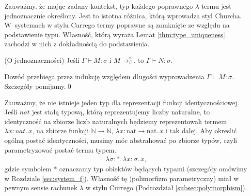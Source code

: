 Zauważmy, że mając zadany kontekst, typ każdego poprawnego \(\lambda\)-termu jest jednoznacznie określony. Jest to istotna różnica, którą wprowadza styl Churcha. W~systemach w stylu Currego termy poprawne są zamknięte ze względu na podstawienie typu. Własność, którą wyraża Lemat \ref{thm:type_uniqueness} zachodzi w nich z dokładnością do podstawienia. 

\begin{lemat}\label{thm:type_uniqueness}(O jednoznaczności)
  Jeśli \(\Gamma\vdash M:\sigma\) i \(M\to^{*}_\beta\), to \(\Gamma\vdash N:\sigma\).
\end{lemat}
\begin{dowod}
  Dowód przebiega przez indukcję względem długości wyprowadzenia \(\Gamma\vdash M:\sigma\). Szczegóły pomijamy.\qed
\end{dowod}

\begin{przyklad}\label{ex:church_identity}
Zauważmy, że nie istnieje jeden typ dla reprezentacji funkcji identycznościowej. Jeśli \(nat\) jest stałą typową, którą reprezentujemy liczby naturalne, to identyczność na zbiorze liczb naturalnych będziemy reprezentowali termem \(\lambda x:nat.\,x\), na zbiorze funkcji \(\mathbb{N}\to\mathbb{N}\), \(\lambda x:\mathrm{nat}\to\mathrm{nat}.\,x\) i tak dalej.
  Aby okreslić ogólną postać identyczności, musimy móc abstrahować po zbiorze typów, czyli parametryzować postać termu typem. %
      \begin{align*}
        \lambda \sigma:* .\,\lambda x:\sigma.\,x,
      \end{align*}
      gdzie symbolem \(*\) oznaczamy typ obiektów będących typami (szczegóły omówimy w Rozdziale \ref{sec:system_f}).
      Własność tę (polimorfizm parametryczny) miał w pewnym sensie rachunek \(\lambda\) w stylu Currego (Podrozdział \ref{subsec:polymorphism}). 
\end{przyklad}

